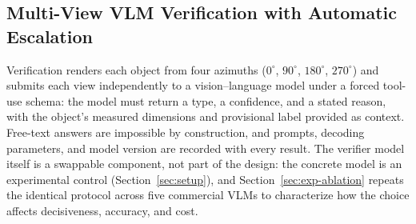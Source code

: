 \documentclass[electronics,article,accept,pdftex,moreauthors]{Definitions/mdpi}
\begin{document}
\subsection{Multi-View VLM Verification with Automatic Escalation}
\label{sec:verification}

Verification renders each object from four azimuths ($0^{\circ}$,
$90^{\circ}$, $180^{\circ}$, $270^{\circ}$) and submits each view
independently to a vision--language model under a forced tool-use
schema: the model must return a type, a confidence, and a stated reason, with
the object's measured dimensions and provisional label provided as context.
Free-text answers are impossible by construction, and prompts, decoding
parameters, and model version are recorded with every result. The verifier
model itself is a swappable component, not part of the design: the concrete
model is an experimental control (Section~\ref{sec:setup}), and Section~\ref{sec:exp-ablation} repeats the
identical protocol across five commercial VLMs to characterize how the
choice affects decisiveness, accuracy, and cost.
\end{document}
